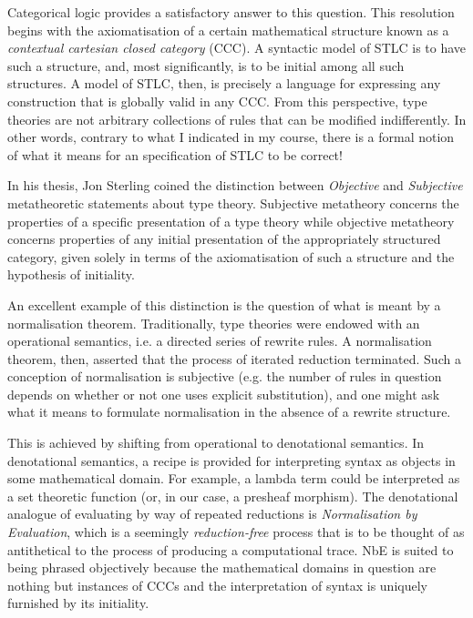 \documentclass{article}[9pt]
\begin{document}
Categorical logic provides a satisfactory answer to this question. This
resolution begins with the axiomatisation of a certain mathematical structure
known as a \emph{contextual cartesian closed category} (CCC). A syntactic model
of STLC is to have such a structure, and, most significantly, is to be initial
among all such structures. A model of STLC, then, is precisely a language for
expressing any construction that is globally valid in any CCC. From this
perspective, type theories are not arbitrary collections of rules that can be
modified indifferently. In other words, contrary to what I indicated in my
course, there is a formal notion of what it means for an specification of STLC
to be correct!

In his thesis, Jon Sterling coined the distinction between \emph{Objective} and
\emph{Subjective} metatheoretic statements about type theory. Subjective
metatheory concerns the properties of a specific presentation of a type theory
while objective metatheory concerns properties of any initial presentation of
the appropriately structured category, given solely in terms of the
axiomatisation of such a structure and the hypothesis of initiality.

An excellent example of this distinction is the question of what is meant by a
normalisation theorem. Traditionally, type theories were endowed with an
operational semantics, i.e. a directed series of rewrite rules. A normalisation
theorem, then, asserted that the process of iterated reduction terminated. Such
a conception of normalisation is subjective (e.g. the number of rules in
question depends on whether or not one uses explicit substitution), and one
might ask what it means to formulate normalisation in the absence of a rewrite
structure.

This is achieved by shifting from operational to denotational semantics. In
denotational semantics, a recipe is provided for interpreting syntax as objects
in some mathematical domain. For example, a lambda term could be interpreted as
a set theoretic function (or, in our case, a presheaf morphism). The
denotational analogue of evaluating by way of repeated reductions is
\emph{Normalisation by Evaluation}, which is a seemingly \emph{reduction-free}
process that is to be thought of as antithetical to the process of producing a
computational trace. NbE is suited to being phrased objectively because the
mathematical domains in question are nothing but instances of CCCs and the
interpretation of syntax is uniquely furnished by its initiality.
\end{document}
